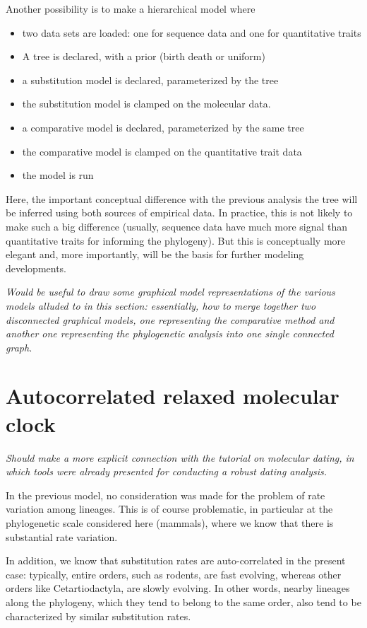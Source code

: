 \documentclass[usletter]{article}
\begin{document}
Another possibility is to make a hierarchical model where
\begin{itemize}
\item
two data sets are loaded: one for sequence data and one for quantitative traits
\item
A tree is declared, with a prior (birth death or uniform)
\item
a substitution model is declared, parameterized by the tree
\item
the substitution model is clamped on the molecular data.
\item
a comparative model is declared, parameterized by the same tree
\item
the comparative model is clamped on the quantitative trait data
\item
the model is run
\end{itemize}
Here, the important conceptual difference with the previous analysis the tree will be inferred using both sources of empirical data. In practice, this is not likely to make such a big difference (usually, sequence data have much more signal than quantitative traits for informing the phylogeny). But this is conceptually more elegant and, more importantly, will be the basis for further modeling developments.

\emph{Would be useful to draw some graphical model representations of the various models alluded to in this section: essentially, how to merge together two disconnected graphical models, one representing the comparative method and another one representing the phylogenetic analysis into one single connected graph.}

\section{Autocorrelated relaxed molecular clock}

\emph{
Should make a more explicit connection with 
the tutorial on molecular dating, in which tools were already presented for conducting a robust dating analysis.}

In the previous model, no consideration was made for the problem of rate variation among lineages. This is of course problematic, in particular at the phylogenetic scale considered here (mammals), where we know that there is substantial rate variation. 

In addition, we know that substitution rates are auto-correlated in the present case: typically, entire orders, such as rodents, are fast evolving, whereas other orders like Cetartiodactyla, are slowly evolving. In other words, nearby lineages along the phylogeny, which they tend to belong to the same order, also tend to be characterized by similar substitution rates.
\end{document}
